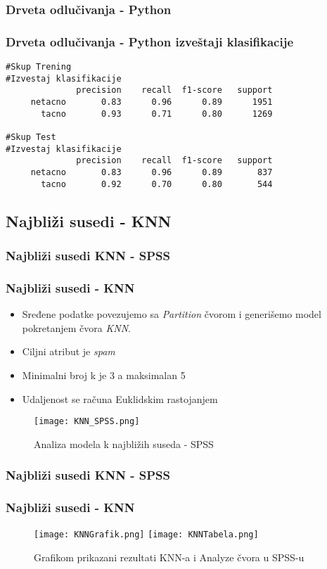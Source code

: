 \documentclass{beamer}
\begin{document}
\subsubsection*{Drveta odlučivanja - Python}
\begin{frame}[fragile]
\frametitle{Drveta odlučivanja - Python izveštaji klasifikacije}
\begin{lstlisting}
#Skup Trening
#Izvestaj klasifikacije
              precision    recall  f1-score   support
     netacno       0.83      0.96      0.89      1951
       tacno       0.93      0.71      0.80      1269

#Skup Test
#Izvestaj klasifikacije
              precision    recall  f1-score   support
     netacno       0.83      0.96      0.89       837
       tacno       0.92      0.70      0.80       544

\end{lstlisting}
\end{frame}

\subsection{Najbliži susedi - KNN}
\subsubsection*{Najbliži susedi KNN - SPSS}
\begin{frame}[fragile]
\frametitle{Najbliži susedi - KNN}
\begin{itemize}
\item Sređene podatke povezujemo sa \textit{Partition} čvorom i generišemo model pokretanjem čvora \textit{KNN}.
\item Ciljni atribut je \textit{spam}
\item Minimalni broj k je 3 a maksimalan 5
\item Udaljenost se računa Euklidskim rastojanjem
\end{itemize}
\begin{figure}
\begin{center}
\texttt{[image: KNN\_SPSS.png]}
\end{center}
\caption{Analiza modela k najbližih suseda - SPSS}
\end{figure}
\end{frame}

\subsubsection*{Najbliži susedi KNN - SPSS}
\begin{frame}[fragile]
\frametitle{Najbliži susedi - KNN}
\begin{figure}[ht!]
	\centering
    \texttt{[image: KNNGrafik.png]}
    \texttt{[image: KNNTabela.png]}
    \caption{Grafikom prikazani rezultati KNN-a i Analyze čvora u SPSS-u}
    \label{fig:KNNTabela}
\end{figure}  
\end{frame}
\end{document}
